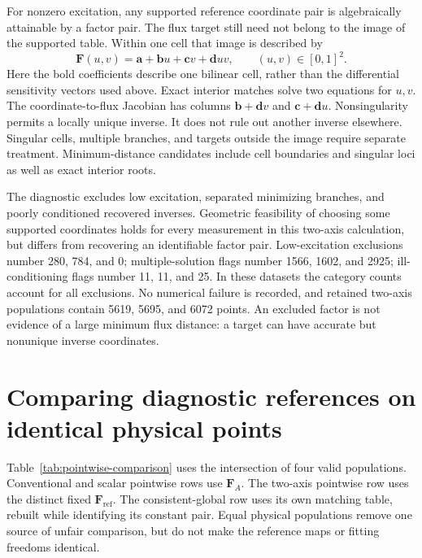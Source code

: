 For nonzero excitation, any supported reference coordinate pair is algebraically attainable by a factor pair. The flux target still need not belong to the image of the supported table. Within one cell that image is described by
\begin{equation}
\bm F(u,v)=\bm a+\bm b u+\bm c v+\bm d uv,
\qquad (u,v)\in[0,1]^2.
\end{equation}
Here the bold coefficients describe one bilinear cell, rather than the differential sensitivity vectors used above. Exact interior matches solve two equations for $u,v$. The coordinate-to-flux Jacobian has columns $\bm b+\bm d v$ and $\bm c+\bm d u$. Nonsingularity permits a locally unique inverse. It does not rule out another inverse elsewhere. Singular cells, multiple branches, and targets outside the image require separate treatment. Minimum-distance candidates include cell boundaries and singular loci as well as exact interior roots.

The diagnostic excludes low excitation, separated minimizing branches, and poorly conditioned recovered inverses. Geometric feasibility of choosing some supported coordinates holds for every measurement in this two-axis calculation, but differs from recovering an identifiable factor pair. Low-excitation exclusions number 280, 784, and 0; multiple-solution flags number 1566, 1602, and 2925; ill-conditioning flags number 11, 11, and 25. In these datasets the category counts account for all exclusions. No numerical failure is recorded, and retained two-axis populations contain 5619, 5695, and 6072 points. An excluded factor is not evidence of a large minimum flux distance: a target can have accurate but nonunique inverse coordinates.

\section{Comparing diagnostic references on identical physical points}

Table~\ref{tab:pointwise-comparison} uses the intersection of four valid populations. Conventional and scalar pointwise rows use $\bm F_A$. The two-axis pointwise row uses the distinct fixed $\bm F_{\mathrm{ref}}$. The consistent-global row uses its own matching table, rebuilt while identifying its constant pair. Equal physical populations remove one source of unfair comparison, but do not make the reference maps or fitting freedoms identical.

